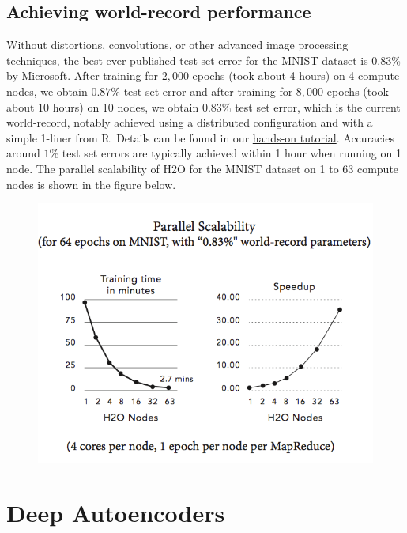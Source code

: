 \subsection{Achieving world-record performance}

Without distortions, convolutions, or other advanced image processing techniques, the best-ever published test set error for the MNIST dataset is $0.83$\% by Microsoft. After training for $2,000$ epochs (took about 4 hours) on 4 compute nodes, we obtain $0.87\%$ test set error and after training for $8,000$ epochs (took about 10 hours) on 10 nodes, we obtain $0.83\%$ test set error, which is the current world-record, notably achieved using a distributed configuration and with a simple 1-liner from R. Details can be found in our \href{http://learn.h2o.ai/content/hands-on_training/deep_learning.html}{hands-on tutorial}. Accuracies around $1\%$ test set errors are typically achieved within 1 hour when running on 1 node.
The parallel scalability of H2O for the MNIST dataset on 1 to 63 compute nodes is shown in the figure below.
\begin{figure}[h!]
\centering
\includegraphics{scalability_new.png}
\end{figure}
\bigskip
\bigskip
\bigskip
\section{Deep Autoencoders}
\label{sec:DeepAutoencoders}  

